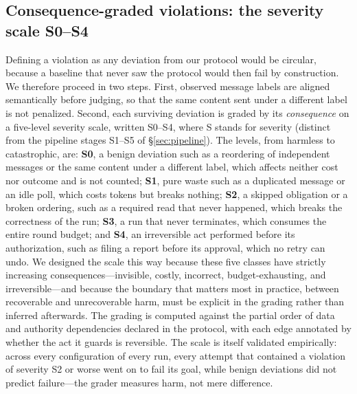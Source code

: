 \documentclass{article}
\begin{document}
\subsection{Consequence-graded violations: the severity scale S0--S4}\label{sec:severity}
Defining a violation as any deviation from our protocol would be circular, because a baseline that never saw the protocol would then fail by construction. We therefore proceed in two steps. First, observed message labels are aligned semantically before judging, so that the same content sent under a different label is not penalized. Second, each surviving deviation is graded by its \emph{consequence} on a five-level severity scale, written S0--S4, where S stands for severity (distinct from the pipeline stages S1--S5 of \S\ref{sec:pipeline}). The levels, from harmless to catastrophic, are: \textbf{S0}, a benign deviation such as a reordering of independent messages or the same content under a different label, which affects neither cost nor outcome and is not counted; \textbf{S1}, pure waste such as a duplicated message or an idle poll, which costs tokens but breaks nothing; \textbf{S2}, a skipped obligation or a broken ordering, such as a required read that never happened, which breaks the correctness of the run; \textbf{S3}, a run that never terminates, which consumes the entire round budget; and \textbf{S4}, an irreversible act performed before its authorization, such as filing a report before its approval, which no retry can undo. We designed the scale this way because these five classes have strictly increasing consequences---invisible, costly, incorrect, budget-exhausting, and irreversible---and because the boundary that matters most in practice, between recoverable and unrecoverable harm, must be explicit in the grading rather than inferred afterwards. The grading is computed against the partial order of data and authority dependencies declared in the protocol, with each edge annotated by whether the act it guards is reversible. The scale is itself validated empirically: across every configuration of every run, every attempt that contained a violation of severity S2 or worse went on to fail its goal, while benign deviations did not predict failure---the grader measures harm, not mere difference.
\end{document}
